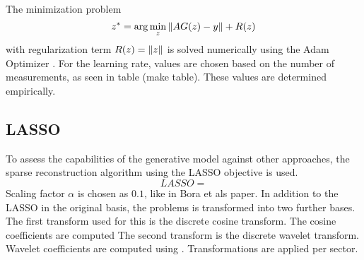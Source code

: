 The minimization problem
\begin{equation}
    z^* = \arg\min_{z}{\left\lVert A G(z) - y\right\rVert + R(z)}
\end{equation}
with regularization term $R(z) = \left\lVert z\right\rVert$ is solved numerically using the Adam Optimizer \parencite{Adam}.
For the learning rate, values are chosen based on the number of measurements, as seen in table (make table).
These values are determined empirically.

\subsection{LASSO}
To assess the capabilities of the generative model against other approaches, the sparse reconstruction algorithm using the LASSO objective is used.
\begin{equation}
    LASSO = 
\end{equation}
Scaling factor $\alpha$ is chosen as $0.1$, like in Bora et als paper.
In addition to the LASSO in the original basis, the problems is transformed into two further bases.
The first transform used for this is the discrete cosine transform.
The cosine coefficients are computed
The second transform is the discrete wavelet transform.
Wavelet coefficients are computed using \parencite{PyWavelets}.
Transformations are applied per sector.
